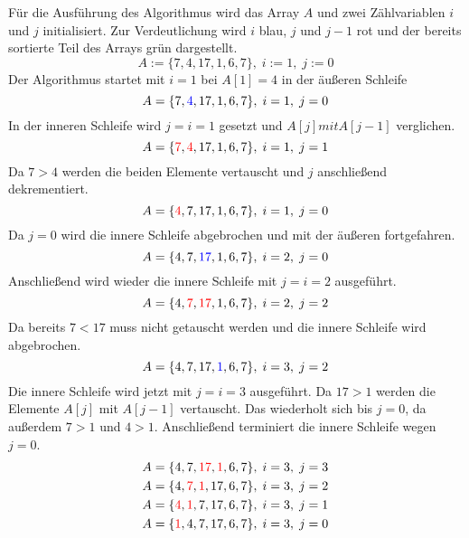 \noindent
Für die Ausführung des Algorithmus wird das Array $A$ und zwei Zählvariablen $i$ und $j$ initialisiert. Zur Verdeutlichung wird $i$ blau, $j$ und $j-1$ rot und der bereits sortierte Teil des Arrays grün dargestellt.
\begin{equation}
	A := \{7, 4, 17, 1, 6, 7\},\;i:=1,\;j:=0
\end{equation}
\noindent
Der Algorithmus startet mit $i=1$ bei $A[1] = 4$ in der äußeren Schleife
\begin{equation}
	A = \{7, \textcolor{blue}{4}, 17, 1, 6, 7\},\;i = 1,\;j=0 \\
\end{equation}
\noindent
In der inneren Schleife wird $j = i = 1$ gesetzt und  $A[j] mit A[j - 1]$ verglichen.
\begin{equation}
	A = \{\textcolor{red}{7}, \textcolor{red}{4}, 17, 1, 6, 7\},\;i = 1,\;j=1 \\
\end{equation}
\noindent
Da $7 > 4$ werden die beiden Elemente vertauscht und $j$ anschließend dekrementiert.
\begin{equation}
	A = \{\textcolor{red}{4}, 7, 17, 1, 6, 7\},\;i = 1,\;j=0 \\
\end{equation}
\noindent
Da $j=0$ wird die innere Schleife abgebrochen und mit der äußeren fortgefahren.
\begin{equation}
	A = \{4, 7, \textcolor{blue}{17}, 1, 6, 7\},\;i = 2,\;j=0 \\
\end{equation}
\noindent
Anschließend wird wieder die innere Schleife mit $j=i=2$ ausgeführt.
\begin{equation}
	A = \{4, \textcolor{red}{7}, \textcolor{red}{17}, 1, 6, 7\},\;i = 2,\;j=2 \\
\end{equation}
\noindent
Da bereits $7 < 17$ muss nicht getauscht werden und die innere Schleife wird abgebrochen.
\begin{equation}
	A = \{4, 7, 17, \textcolor{blue}{1}, 6, 7\},\;i = 3,\;j=2 \\
\end{equation}
\noindent
Die innere Schleife wird jetzt mit $j=i=3$ ausgeführt. Da $17 > 1$ werden die Elemente $A[j]$ mit $A[j-1]$ vertauscht. Das wiederholt sich bis $j=0$, da außerdem $7 > 1$ und $4>1$. Anschließend terminiert die innere Schleife wegen $j=0$.
\begin{equation}
	\begin{split}
		A = \{4, 7,  \textcolor{red}{17}, \textcolor{red}{1}, 6, 7\},\;i = 3,\;j=3 \\
		A = \{4, \textcolor{red}{7},  \textcolor{red}{1}, 17, 6, 7\},\;i = 3,\;j=2 \\
		A = \{\textcolor{red}{4}, \textcolor{red}{1},  7, 17, 6, 7\},\;i = 3,\;j=1 \\
		A = \{\textcolor{red}{1}, 4,  7, 17, 6, 7\},\;i = 3,\;j=0 \\
	\end{split}
\end{equation}
